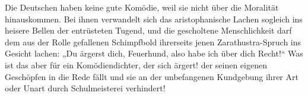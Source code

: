 Die Deutschen haben keine gute Komödie, weil sie nicht über die Moralität hinauskommen. Bei ihnen verwandelt sich das aristophanische Lachen sogleich ins heisere Bellen der entrüsteten Tugend, und die gescholtene Menschlichkeit darf dem aus der Rolle gefallenen Schimpfbold ihrerseits jenen Zarathustra-Spruch ins Gesicht lachen: „Du ärgerst dich, Feuerhund, also habe ich über dich Recht!“ Was ist das aber für ein Komödiendichter, der sich ärgert! der seinen eigenen Geschöpfen in die Rede fällt und sie an der unbefangenen Kundgebung ihrer Art oder Unart durch Schulmeisterei verhindert!
\par

